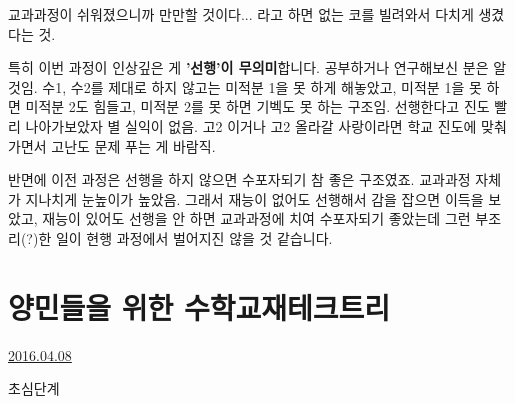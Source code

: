 교과과정이 쉬워졌으니까 만만할 것이다... 라고 하면 없는 코를 빌려와서 다치게 생겼다는 것.
\vspace{5mm}

특히 이번 과정이 인상깊은 게 \textbf{'선행'이 무의미}합니다. 공부하거나 연구해보신 분은 알 것임.
수1, 수2를 제대로 하지 않고는 미적분 1을 못 하게 해놓았고, 미적분 1을 못 하면 미적분 2도 힘들고, 미적분 2를 못 하면 기벡도 못 하는 구조임.
선행한다고 진도 빨리 나아가보았자 별 실익이 없음. 고2 이거나 고2 올라갈 사랑이라면 학교 진도에 맞춰가면서 고난도 문제 푸는 게 바람직.
\vspace{5mm}

반면에 이전 과정은 선행을 하지 않으면 수포자되기 참 좋은 구조였죠. 교과과정 자체가 지나치게 눈높이가 높았음.
그래서 재능이 없어도 선행해서 감을 잡으면 이득을 보았고, 재능이 있어도 선행을 안 하면 교과과정에 치여 수포자되기 좋았는데
그런 부조리(?)한 일이 현행 과정에서 벌어지진 않을 것 같습니다.
\vspace{5mm}








\section{양민들을 위한 수학교재테크트리}
\href{https://www.kockoc.com/Apoc/717659}{2016.04.08}

\vspace{5mm}

초심단계
\vspace{5mm}

